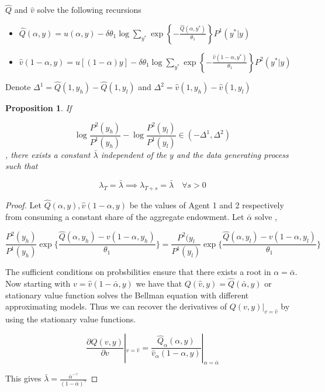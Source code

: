 \documentclass[12pt]{article}
\newtheorem{proposition}{Proposition}
\begin{document}
$\hat{Q}$ and $\hat{v}$ solve the following recursions

\begin{itemize}
\item $\hat{Q}(\alpha , y) = u(\alpha,y)-\delta \theta_1 \log \sum_{y^*} \exp\left\{ -\frac{\hat{Q}(\alpha,y^*)}{\theta_1}\right\} P^1(y^*|y)$
\item $\hat{v}(1-\alpha , y) = u[(1-\alpha)y]-\delta \theta_1 \log \sum_{y^*} \exp\left\{ -\frac{\hat{v}(1-\alpha,y^*)}{\theta_1}\right\} P^2(y^*|y)$
\end{itemize}

Denote $\Delta^1 = \hat{Q}(1, y_h)-\hat{Q}(1 , y_l)$ and  $\Delta^2 = \hat{v}(1, y_h)-\hat{v}(1 , y_l)$

\begin{proposition}
If 

\[ \log \frac{P^2(y_h)}{P^1(y_h)}- \log \frac{P^2(y_l)}{P^1(y_l)} \in (-\Delta^1,\Delta^2) \] , there exists a constant $\bar{\lambda}$ independent of the $y$ and the data generating process such that

\[\lambda_T= \bar{\lambda} \implies \lambda_{T+s}=\bar{\lambda} \quad \forall s>0\]

\end{proposition}


\begin{proof}

Let $\hat{Q}(\alpha,y), \hat{v}(1-\alpha,y)$ be the values of Agent 1 and 2 respectively from consuming a constant share of the aggregate endowment.  Let $\bar{\alpha}$ solve ,


\[   \frac{P^2(y_h)}{P^1(y_h)} \exp\{\frac{ \hat {Q}(\alpha,y_h)- v(1-\alpha,y_h)}{\theta_1} \}  =   \frac{P^2(y_l}{P^1(y_l)} \exp\{\frac{ \hat {Q}(\alpha,y_l)- v(1-\alpha,y_l)}{\theta_1} \} \]

The sufficient conditions on probsbilities ensure that there exists a  root in $\alpha=\bar{\alpha}$.  Now starting with $v=\hat{v}(1-\bar{\alpha},y)$ we have that $Q(\hat{v},y)=\hat{Q}(\bar{\alpha},y)$ or stationary value function solves the Bellman equation with different approximating models. Thus we can recover the derivatives of $Q(v,y)|_{v=\hat{v}}$ by using the stationary value functions.


\[ \frac{\partial Q(v,y) }{\partial v}|_{v=\hat{v}} = \frac{  \hat{Q}_{\alpha}(\alpha,y)  } { \hat{v}_{\alpha}(1-\alpha,y)} |_{\alpha=\bar{\alpha}} \] 


This gives $\bar{\lambda} = \frac{\bar{\alpha}^{-\gamma}}{(1-\bar{\alpha})^{\gamma}}$


\end{proof}
\end{document}
